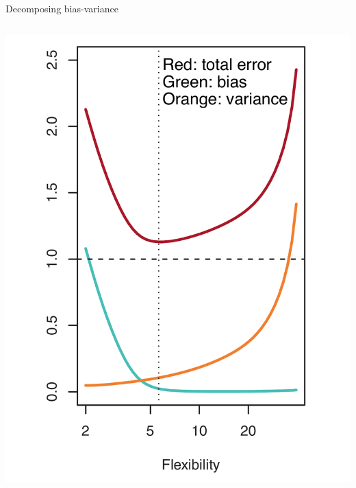 \documentclass[aspectratio=169]{beamer}
\begin{document}
\begin{frame}{Decomposing bias-variance}
\begin{columns}
\pause 
\includegraphics[scale=0.21]{figures/islr2_12a_text.pdf}

\end{columns}

\end{frame}
\end{document}
